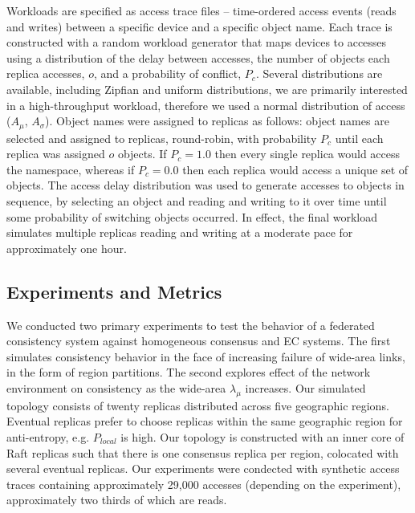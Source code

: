 Workloads are specified as access trace files -- time-ordered access events (reads and writes) between a specific device and a specific object name.
Each trace is constructed with a random workload generator that maps devices to accesses using a distribution of the delay between accesses, the number of objects each replica accesses, $o$, and a probability of conflict, $P_c$.
Several distributions are available, including Zipfian and uniform distributions, we are primarily interested in a high-throughput workload, therefore we used a normal distribution of access ($A_{\mu}$, $A_{\sigma}$).
Object names were assigned to replicas as follows: object names are selected and assigned to replicas, round-robin, with probability $P_c$ until each replica was assigned $o$ objects.
If $P_c = 1.0$ then every single replica would access the namespace, whereas if $P_c = 0.0$ then each replica would access a unique set of objects.
The access delay distribution was used to generate accesses to objects in
sequence, by selecting an object and reading and writing to it over time until some probability of switching objects occurred.
In effect, the final workload simulates multiple replicas reading and writing at a moderate pace for approximately one hour.

\subsection{Experiments and Metrics}
\label{ch04_experiments}

We conducted two primary experiments to test the behavior of a federated consistency system against homogeneous consensus and EC systems.
The first simulates consistency behavior in the face of increasing failure of wide-area links, in the form of region partitions.
The second explores effect of the network environment on consistency as the wide-area $\lambda_\mu$ increases.
Our simulated topology consists of twenty replicas distributed across five geographic regions.
Eventual replicas prefer to choose replicas within the same geographic region for anti-entropy, e.g. $P_{local}$ is high.
Our topology is constructed with an inner core of Raft replicas such that there is one consensus replica per region, colocated with several eventual replicas.
Our experiments were condected with synthetic access traces containing approximately 29,000 accesses (depending on the experiment), approximately two thirds of which are reads.

